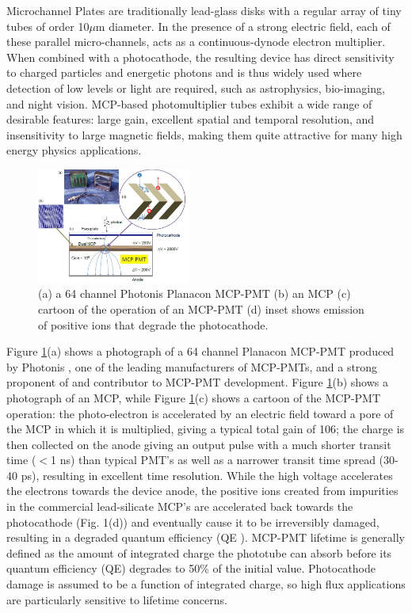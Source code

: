 
Microchannel Plates are traditionally lead-glass disks with a regular array of tiny tubes of order 10$\mu$m diameter. In the presence of a strong electric field, each of these parallel micro-channels, acts as a continuous-dynode electron multiplier. When combined with a photocathode, the resulting device has direct sensitivity to charged particles and energetic photons and is thus widely used where detection of low levels or light are required, such as astrophysics, bio-imaging, and night vision. MCP-based photomultiplier tubes exhibit a wide range of desirable features: large gain, excellent spatial and temporal resolution, and insensitivity to large magnetic fields, making them quite attractive for many high energy physics applications.

\begin{figure}[htb]
\centering
\includegraphics[width=0.45\textwidth]{images/figure1Brandt.jpg}
\caption[]{(a) a 64 channel Photonis Planacon MCP-PMT (b) an MCP (c) cartoon of the operation of an MCP-PMT (d) inset shows emission of positive ions that degrade the photocathode.}
\label{fig:PlanCon}
\end{figure}

Figure \ref{fig:PlanCon}(a) shows a photograph of a 64 channel Planacon MCP-PMT produced by Photonis \cite{Photonis}, one of the leading manufacturers of MCP-PMTs, and a strong proponent of and contributor to MCP-PMT development. Figure \ref{fig:PlanCon}(b) shows a photograph of an MCP, while Figure \ref{fig:PlanCon}(c) shows a cartoon of the MCP-PMT operation: the photo-electron is accelerated by an electric field toward a pore of the MCP in which it is multiplied, giving a typical total gain of 106; the charge is then collected on the anode giving an output pulse with a much shorter transit time ($<$1 ns) than typical PMT's as well as a narrower transit time spread (30-40 ps), resulting in excellent time resolution.   While the high voltage accelerates the electrons towards the device anode, the positive ions created from impurities in the commercial lead-silicate MCP's are accelerated back towards the photocathode (Fig. 1(d)) and eventually cause it to be irreversibly damaged, resulting in a degraded quantum efficiency (QE ). MCP-PMT lifetime is generally defined as the amount of integrated charge the phototube can absorb before its quantum efficiency (QE) degrades to 50\% of the initial value\cite{life}.  Photocathode damage is assumed to be a function of integrated charge, so high flux applications are particularly sensitive to lifetime concerns.  

